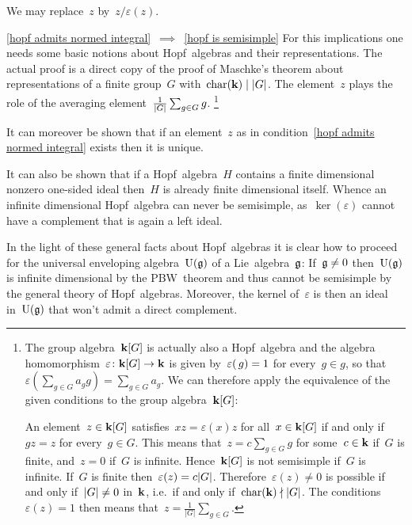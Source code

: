 \begin{remark}
\begin{implicationlist}
      We may replace~$z$ by~$z/\varepsilon(z)$.
    \item[\ref*{hopf admits normed integral}~$\implies$~\ref*{hopf is semisimple}]
      For this implications one needs some basic notions about Hopf~algebras and their representations.
      The actual proof is a direct copy of the proof of Maschke’s theorem about representations of a finite group~$G$ with~$\operatorname{char}(\mathbf{k}) \mid \lvert G\rvert$.
      The element~$z$ plays the role of the averaging element~$\frac{1}{\lvert G\rvert} \sum_{g \in G} g$.%
      \footnote{The group algebra~$\mathbf{k}[G]$ is actually also a Hopf~algebra and the algebra homomorphism~$\varepsilon \colon \mathbf{k}[G] \to \mathbf{k}$ is given by~$\varepsilon(\, g) = 1$ for every~$g \in g$, so that~$\varepsilon(\sum_{g \in G} a_g g) = \sum_{g \in G} a_g$.
      We can therefore apply the equivalence of the given conditions to the group algebra~$\mathbf{k}[G]$:
      
      An element~$z \in \mathbf{k}[G]$ satisfies~$xz = \varepsilon(x)z$ for all~$x \in \mathbf{k}[G]$ if and only if~$gz = z$ for every~$g \in G$.
      This means that~$z = c \sum_{g \in G} g$ for some~$c \in \mathbf{k}$ if~$G$ is finite, and~$z = 0$ if~$G$ is infinite.
      Hence~$\mathbf{k}[G]$ is not semisimple if~$G$ is infinite.
      If~$G$ is finite then~$\varepsilon(z) = c \lvert G\rvert$.
      Therefore~$\varepsilon(z) \neq 0$ is possible if and only if~$\lvert G\rvert \neq 0$ in~$\mathbf{k}$, i.e.\ if and only if~$\operatorname{char}(\mathbf{k}) \nmid \lvert G\rvert$.
      The conditions~$\varepsilon(z) = 1$ then means that~$z = \frac{1}{|G|} \sum_{g \in G}$.
      }
  \end{implicationlist}
  It can moreover be shown that if an element~$z$ as in condition~\ref*{hopf admits normed integral} exists then it is unique.
  
  It can also be shown that if a Hopf~algebra~$H$ contains a finite dimensional nonzero one-sided ideal then~$H$ is already finite dimensional itself.
  Whence an infinite dimensional Hopf~algebra can never be semisimple, as~$\ker(\varepsilon)$ cannot have a complement that is again a left ideal.
  
  In the light of these general facts about Hopf~algebras it is clear how to proceed for the universal enveloping algebra~$\operatorname{U}(\mathfrak{g})$ of a Lie~algebra~$\mathfrak{g}$:
  If~$\mathfrak{g} \neq 0$ then~$\operatorname{U}(\mathfrak{g})$ is infinite dimensional by the PBW~theorem and thus cannot be semisimple by the general theory of Hopf~algebras.
  Moreover, the kernel of~$\varepsilon$ is then an ideal in~$\operatorname{U}(\mathfrak{g})$ that won’t admit a direct complement.
\end{remark}




